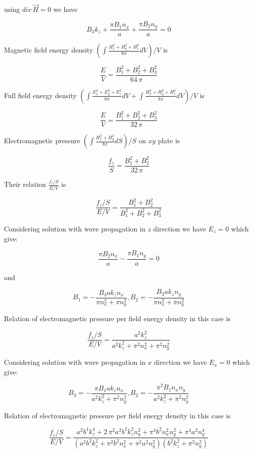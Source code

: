 \documentclass[11pt]{article}
\begin{document}
    using \(div\,\vec{H} = 0\) we have

\[B_{3} k_{z} + \frac{\pi B_{1} n_{x}}{a} + \frac{\pi B_{2} n_{y}}{a} = 0\]

    Magnetic field energy density
\(\left(\int \frac{H_x^2+H_y^2+H_z^2}{8 \pi}dV\right)\big/{V}\) is

\[\frac{E}{V} = \frac{{B_{1}^{2} + B_{2}^{2} + B_{3}^{2}}}{64 \, \pi}\]

    Full field energy density
\(\left(\int \frac{E_x^2+E_y^2+E_z^2}{8 \pi}dV + \int \frac{H_x^2+H_y^2+H_z^2}{8 \pi}dV\right)\big/{V}\)
is

    \[\frac{E}{V} = \frac{{B_{1}^{2} + B_{2}^{2} + B_{3}^{2}}}{32 \, \pi}\]

    Electromagnetic pressure
\(\left({\int \frac {H_x^2+H_y^2}{8 \pi} dS}\right)\big/{S}\) on \(xy\)
plate is

\[\frac{f_z}{S}=\frac{{B_{1}^{2} + B_{2}^{2}}}{32 \, \pi}\]

Their relation \(\frac{f_z/S}{E/V}\) is

\[\frac{f_z/S}{E/V} = \frac{{B_{1}^{2} + B_{2}^{2}}}{B_{1}^{2} + B_{2}^{2} + B_{3}^{2}}\]

Considering solution with wave propagation in \(z\) direction we have
\(E_z = 0\) which give:

\[\frac{\pi B_{2} n_{x}}{a} - \frac{\pi B_{1} n_{y}}{a} = 0\]

and

\[B_1 = -\frac{B_{3} a k_{z} n_{x}}{\pi n_{x}^{2} + \pi n_{y}^{2}},
B_2 = -\frac{B_{3} a k_{z} n_{y}}{\pi n_{x}^{2} + \pi n_{y}^{2}}\]

Relation of electromagnetic pressure per field energy density in this
case is

\[\frac{f_z/S}{E/V} = \frac{a^{2} k_{z}^{2}}{a^{2} k_{z}^{2} + \pi^{2} n_{x}^{2} + \pi^{2} n_{y}^{2}}\]

    Considering solution with wave propagation in \(x\) direction we have
\(E_x = 0\) which give:

\[B_3 = -\frac{\pi B_{1} a k_{z} n_{x}}{a^{2} k_{z}^{2} + \pi^{2} n_{y}^{2}}, 
B_2 = -\frac{\pi^{2} B_{1} n_{x} n_{y}}{a^{2} k_{z}^{2} + \pi^{2} n_{y}^{2}}\]

Relation of electromagnetic pressure per field energy density in this
case is

\[\frac{f_z/S}{E/V} = \frac{a^{2} b^{4} k_{z}^{4} + 2 \, \pi^{2} a^{2} b^{2} k_{z}^{2} n_{y}^{2} + \pi^{4} b^{2} n_{x}^{2} n_{y}^{2} + \pi^{4} a^{2} n_{y}^{4}}{{\left(a^{2} b^{2} k_{z}^{2} + \pi^{2} b^{2} n_{x}^{2} + \pi^{2} a^{2} n_{y}^{2}\right)} {\left(b^{2} k_{z}^{2} + \pi^{2} n_{y}^{2}\right)}}\]
\end{document}
